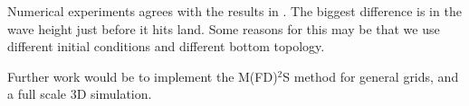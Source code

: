 \documentclass[11pt]{article}
\begin{document}
Numerical experiments agrees with the results in \citep{harbitz14}. The biggest difference is in the wave height just before it hits land. Some reasons for this may be that we use different initial conditions and different 
bottom topology.

Further work would be to implement the M(FD)$^2$S method for general grids, and a full scale 3D simulation.


  
\end{document}
